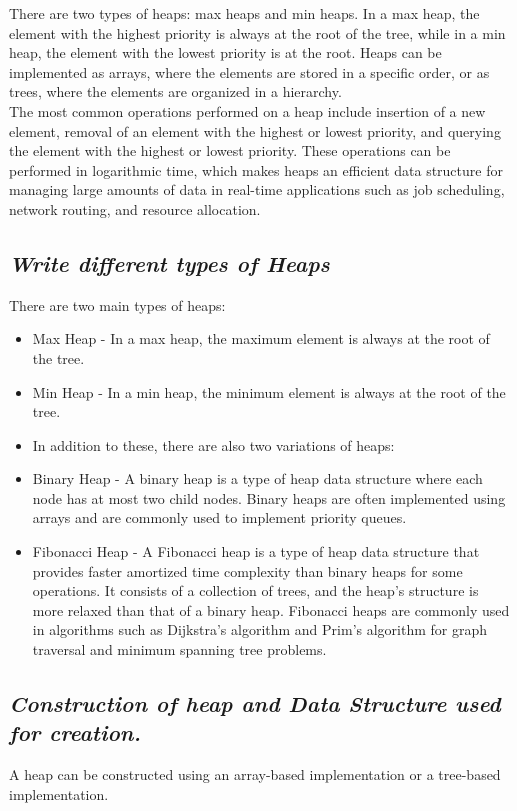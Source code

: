\documentclass{article}
\begin{document}
There are two types of heaps: max heaps and min heaps. In a max heap, the element with the highest priority is always at the root of the tree, while in a min heap, the element with the lowest priority is at the root. Heaps can be implemented as arrays, where the elements are stored in a specific order, or as trees, where the elements are organized in a hierarchy.\\

The most common operations performed on a heap include insertion of a new element, removal of an element with the highest or lowest priority, and querying the element with the highest or lowest priority. These operations can be performed in logarithmic time, which makes heaps an efficient data structure for managing large amounts of data in real-time applications such as job scheduling, network routing, and resource allocation.
\subsection{\textit{Write different types of Heaps}}
There are two main types of heaps:
\begin{itemize}
	\item Max Heap - In a max heap, the maximum element is always at the root of the tree.
	\item Min Heap - In a min heap, the minimum element is always at the root of the tree.
	\item In addition to these, there are also two variations of heaps:
	\item Binary Heap - A binary heap is a type of heap data structure where each node has at most two child nodes. Binary heaps are often implemented using arrays and are commonly used to implement priority queues.
	\item Fibonacci Heap - A Fibonacci heap is a type of heap data structure that provides faster amortized time complexity than binary heaps for some operations. It consists of a collection of trees, and the heap's structure is more relaxed than that of a binary heap. Fibonacci heaps are commonly used in algorithms such as Dijkstra's algorithm and Prim's algorithm for graph traversal and minimum spanning tree problems.
\end{itemize}
\subsection{\textit{Construction of heap and Data Structure used for creation.}}
A heap can be constructed using an array-based implementation or a tree-based implementation.\\
\end{document}
